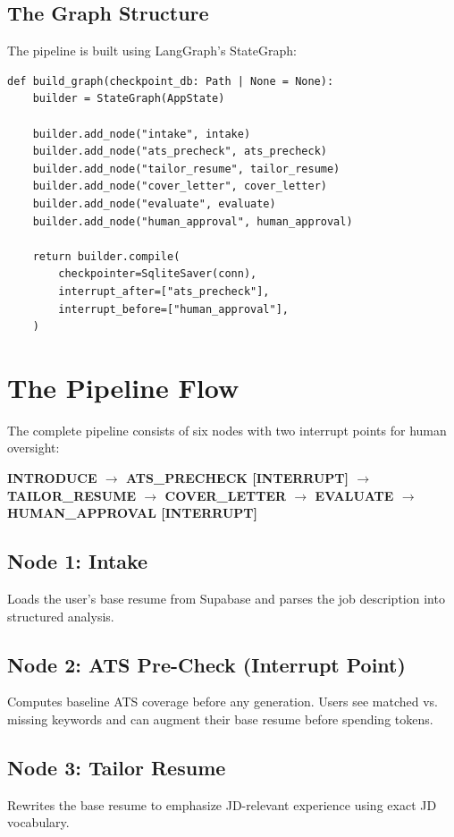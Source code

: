\documentclass[12pt, a4paper]{article}
\begin{document}
\subsection{The Graph Structure}

The pipeline is built using LangGraph's StateGraph:

\begin{verbatim}
def build_graph(checkpoint_db: Path | None = None):
    builder = StateGraph(AppState)

    builder.add_node("intake", intake)
    builder.add_node("ats_precheck", ats_precheck)
    builder.add_node("tailor_resume", tailor_resume)
    builder.add_node("cover_letter", cover_letter)
    builder.add_node("evaluate", evaluate)
    builder.add_node("human_approval", human_approval)

    return builder.compile(
        checkpointer=SqliteSaver(conn),
        interrupt_after=["ats_precheck"],
        interrupt_before=["human_approval"],
    )
\end{verbatim}

\newpage

\section{The Pipeline Flow}

The complete pipeline consists of six nodes with two interrupt points for human oversight:

\bigskip

\textbf{INTRODUCE $\rightarrow$ ATS\_PRECHECK [INTERRUPT] $\rightarrow$ TAILOR\_RESUME $\rightarrow$ COVER\_LETTER $\rightarrow$ EVALUATE $\rightarrow$ HUMAN\_APPROVAL [INTERRUPT]}

\bigskip

\subsection*{Node 1: Intake}
Loads the user's base resume from Supabase and parses the job description into structured analysis.

\subsection*{Node 2: ATS Pre-Check (Interrupt Point)}
Computes baseline ATS coverage before any generation. Users see matched vs. missing keywords and can augment their base resume before spending tokens.

\subsection*{Node 3: Tailor Resume}
Rewrites the base resume to emphasize JD-relevant experience using exact JD vocabulary.
\end{document}
